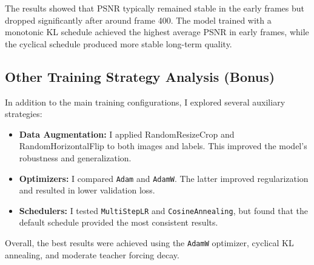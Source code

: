 The results showed that PSNR typically remained stable in the early frames but dropped significantly after around frame 400. The model trained with a monotonic KL schedule achieved the highest average PSNR in early frames, while the cyclical schedule produced more stable long-term quality.

\subsection{Other Training Strategy Analysis (Bonus)}

In addition to the main training configurations, I explored several auxiliary strategies:

\begin{itemize}
    \item \textbf{Data Augmentation:} I applied RandomResizeCrop and RandomHorizontalFlip to both images and labels. This improved the model's robustness and generalization.
    \item \textbf{Optimizers:} I compared \texttt{Adam} and \texttt{AdamW}. The latter improved regularization and resulted in lower validation loss.
    \item \textbf{Schedulers:} I tested \texttt{MultiStepLR} and \texttt{CosineAnnealing}, but found that the default schedule provided the most consistent results.
\end{itemize}

Overall, the best results were achieved using the \texttt{AdamW} optimizer, cyclical KL annealing, and moderate teacher forcing decay.
